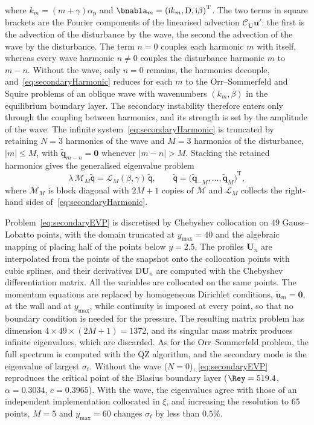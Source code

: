 \documentclass[lineno]{jfm}
\newcommand\awave{{\alpha_\mathrm{p}}} %
\begin{document}
where $k_m=(m+\gamma)\awave$ and $\bnabla_m={(\mathrm{i}k_m,\mathrm{D},\mathrm{i}\beta)}^\mathrm{T}$. The two terms in square brackets are the Fourier components of the linearised advection $\mathcal{C}_{\boldsymbol{U}}\boldsymbol{u}'$: the first is the advection of the disturbance by the wave, the second the advection of the wave by the disturbance. The term $n=0$ couples each harmonic $m$ with itself, whereas every wave harmonic $n\neq0$ couples the disturbance harmonic $m$ to $m-n$. Without the wave, only $n=0$ remains, the harmonics decouple, and~\eqref{eq:secondaryHarmonic} reduces for each $m$ to the Orr--Sommerfeld and Squire problems of an oblique wave with wavenumbers $(k_m,\beta)$ in the equilibrium boundary layer. The secondary instability therefore enters only through the coupling between harmonics, and its strength is set by the amplitude of the wave. The infinite system~\eqref{eq:secondaryHarmonic} is truncated by retaining $N=3$ harmonics of the wave and $M=3$ harmonics of the disturbance, $|m|\leq M$, with $\tilde{\boldsymbol{q}}_{m-n}=\boldsymbol{0}$ whenever $|m-n|>M$. Stacking the retained harmonics gives the generalised eigenvalue problem
\begin{equation}\label{eq:secondaryEVP}
	\lambda\,\boldsymbol{\mathcal{M}}_M\tilde{\boldsymbol{\mathsf{q}}}=\boldsymbol{\mathcal{L}}_M(\beta,\gamma)\,\tilde{\boldsymbol{\mathsf{q}}},
	\qquad
	\tilde{\boldsymbol{\mathsf{q}}}={\big(\tilde{\boldsymbol{q}}_{-M},\ldots,\tilde{\boldsymbol{q}}_{M}\big)}^\mathrm{T},
\end{equation}
where $\boldsymbol{\mathcal{M}}_M$ is block diagonal with $2M+1$ copies of $\boldsymbol{\mathcal{M}}$ and $\boldsymbol{\mathcal{L}}_M$ collects the right-hand sides of~\eqref{eq:secondaryHarmonic}.

Problem~\eqref{eq:secondaryEVP} is discretised by Chebyshev collocation on $49$ Gauss--Lobatto points, with the domain truncated at $y_{\max}=40$ and the algebraic mapping of \citet{malik1990} placing half of the points below $y=2.5$. The profiles $\boldsymbol{U}_n$ are interpolated from the points of the snapshot onto the collocation points with cubic splines, and their derivatives $\mathrm{D}\boldsymbol{U}_n$ are computed with the Chebyshev differentiation matrix. All the variables are collocated on the same points. The momentum equations are replaced by homogeneous Dirichlet conditions, $\tilde{\boldsymbol{u}}_m=\boldsymbol{0}$, at the wall and at $y_{\max}$, while continuity is imposed at every point, so that no boundary condition is needed for the pressure. The resulting matrix problem has dimension $4\times49\times(2M+1)=1372$, and its singular mass matrix produces infinite eigenvalues, which are discarded. As for the Orr--Sommerfeld problem, the full spectrum is computed with the QZ algorithm, and the secondary mode is the eigenvalue of largest $\sigma_t$. Without the wave ($N=0$), \eqref{eq:secondaryEVP} reproduces the critical point of the Blasius boundary layer ($\Rey=519.4$, $\alpha=0.3034$, $c=0.3965$). With the wave, the eigenvalues agree with those of an independent implementation collocated in $\xi$, and increasing the resolution to $65$ points, $M=5$ and $y_{\max}=60$ changes $\sigma_t$ by less than $0.5\%$.
\end{document}

